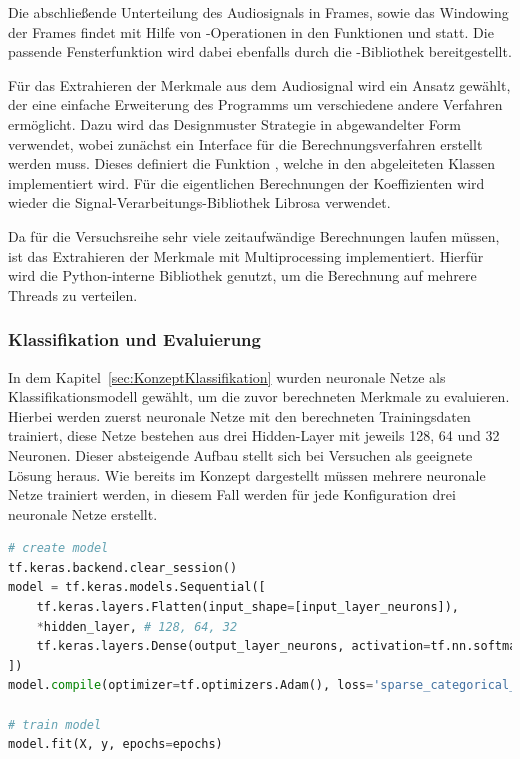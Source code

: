 Die abschließende Unterteilung des Audiosignals
in Frames, sowie das Windowing der Frames findet mit Hilfe von -Operationen in den Funktionen  und  statt.
Die passende Fensterfunktion wird dabei ebenfalls durch die -Bibliothek bereitgestellt.

Für das Extrahieren der Merkmale aus dem Audiosignal wird ein Ansatz gewählt, der eine einfache Erweiterung des Programms um verschiedene andere Verfahren ermöglicht.
Dazu wird das Designmuster Strategie in abgewandelter Form verwendet, wobei zunächst ein Interface für die Berechnungsverfahren erstellt werden muss.
Dieses definiert die Funktion , welche in den abgeleiteten Klassen implementiert wird.
Für die eigentlichen Berechnungen der Koeffizienten wird wieder die Signal-Verarbeitungs-Bibliothek Librosa verwendet.


Da für die Versuchsreihe sehr viele zeitaufwändige Berechnungen laufen müssen, ist das Extrahieren der Merkmale mit Multiprocessing implementiert.
Hierfür wird die Python-interne Bibliothek  genutzt, um die Berechnung auf mehrere Threads zu verteilen.



\subsubsection{Klassifikation und Evaluierung}
In dem Kapitel~\ref{sec:KonzeptKlassifikation} wurden neuronale Netze als Klassifikationsmodell gewählt, um die zuvor berechneten Merkmale zu evaluieren.
Hierbei werden zuerst neuronale Netze mit den berechneten Trainingsdaten trainiert, diese Netze bestehen aus drei Hidden-Layer mit jeweils 128, 64 und 32 Neuronen.
Dieser absteigende Aufbau stellt sich bei Versuchen als geeignete Lösung heraus.
Wie bereits im Konzept dargestellt müssen mehrere neuronale Netze trainiert werden, in diesem Fall werden für jede Konfiguration drei neuronale Netze erstellt.

\begin{lstlisting}[language=Python,numbers=none,caption=Erstellen und Trainieren eines neuronalen Netzes,label=lst-nn]
# create model
tf.keras.backend.clear_session()
model = tf.keras.models.Sequential([
    tf.keras.layers.Flatten(input_shape=[input_layer_neurons]),
    *hidden_layer, # 128, 64, 32
    tf.keras.layers.Dense(output_layer_neurons, activation=tf.nn.softmax),
])
model.compile(optimizer=tf.optimizers.Adam(), loss='sparse_categorical_crossentropy', metrics=['accuracy'])

# train model
model.fit(X, y, epochs=epochs)
\end{lstlisting}

